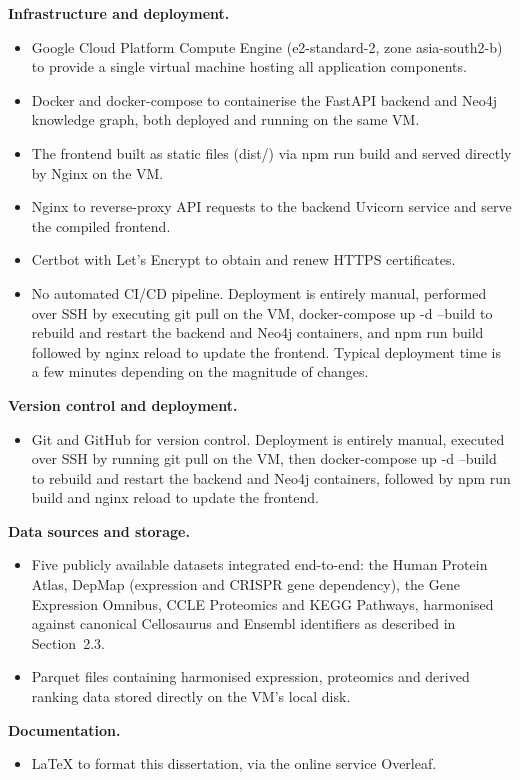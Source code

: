 \documentclass[author={Karen Coutinho, Ishaan Bhalla, Aman Raj, Dixit Kaloorani Malarmannan},
                supervisor={Dr. Daniel D'Andrea},
                degree={MSc},
                title={CellSelector Omics: A Multi-Omics Recommendation System for Cell Line Selection},
                subtitle={},
                type={},
                year={2026}]{dissertation}
\begin{document}
\textbf{Infrastructure and deployment.}
\begin{itemize}
    \item Google Cloud Platform Compute Engine (e2-standard-2, zone asia-south2-b) to provide a single virtual machine hosting all application components.
    \item Docker and docker-compose to containerise the FastAPI backend and Neo4j knowledge graph, both deployed and running on the same VM.
    \item The frontend built as static files (dist/) via npm run build and served directly by Nginx on the VM.
    \item Nginx to reverse-proxy API requests to the backend Uvicorn service and serve the compiled frontend.
    \item Certbot with Let's Encrypt to obtain and renew HTTPS certificates.
    \item No automated CI/CD pipeline. Deployment is entirely manual, performed over SSH by executing git pull on the VM, docker-compose up -d --build to rebuild and restart the backend and Neo4j containers, and npm run build followed by nginx reload to update the frontend. Typical deployment time is a few minutes depending on the magnitude of changes.
\end{itemize}

\textbf{Version control and deployment.}
\begin{itemize}
    \item Git and GitHub for version control. Deployment is entirely manual, executed over SSH by running git pull on the VM, then docker-compose up -d --build to rebuild and restart the backend and Neo4j containers, followed by npm run build and nginx reload to update the frontend.
\end{itemize}

\textbf{Data sources and storage.}
\begin{itemize}
    \item Five publicly available datasets integrated end-to-end: the Human Protein Atlas, DepMap (expression and CRISPR gene dependency), the Gene Expression Omnibus, CCLE Proteomics and KEGG Pathways, harmonised against canonical Cellosaurus and Ensembl identifiers as described in Section~2.3.
    \item Parquet files containing harmonised expression, proteomics and derived ranking data stored directly on the VM's local disk.
\end{itemize}

\textbf{Documentation.}
\begin{itemize}
    \item LaTeX to format this dissertation, via the online service Overleaf.
\end{itemize}
\end{document}
